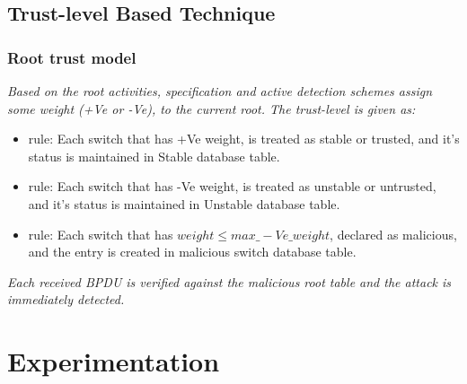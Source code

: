 \documentclass[10pt, blue,subsection=true, compress]{beamer}
\begin{document}
\subsection*{Trust-level Based Technique}
\begin{frame} \frametitle{Root trust model}
\emph{Based on the root activities, specification and active detection schemes assign some weight (+Ve or -Ve), to the current root. The trust-level is given as:}
\begin{itemize}
\item rule: Each switch that has +Ve weight, is treated as stable or trusted, and it's status is maintained in Stable
 database table.
 \item rule: Each switch that has -Ve weight, is treated as unstable or untrusted, and it's status is maintained in Unstable database table.
 \item   rule: Each switch that has \begin{math} weight \leq  max\_−Ve\_weight \end{math}, declared as                     malicious, and the entry is created in malicious switch database table.
      
\end{itemize}
\emph{Each received BPDU is verified against the malicious root table and the attack is immediately detected.}
\end{frame}         

\section{Experimentation}
\end{document}
